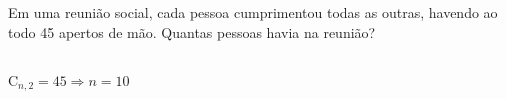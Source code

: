 \begin{ex}
 Em uma reunião social, cada pessoa cumprimentou todas as outras, havendo ao todo 45 apertos de mão. Quantas pessoas havia na reunião?
   \begin{sol}
     \phantom{A} \\
     $\mathrm{C}_{n,2}=45\Longrightarrow n=10$
   \end{sol}
\end{ex}